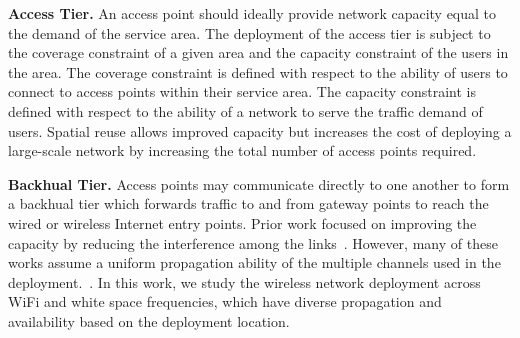 \textbf{Access Tier.} 
An access point should ideally provide network capacity equal to the demand of the service 
area. The deployment of the access tier is subject to the coverage constraint of a given area and the capacity 
constraint of the users in the area. The coverage constraint is defined with respect to the ability of 
users to connect to access points within their service area. The capacity constraint is defined with 
respect to the ability of a network to serve the traffic demand of users. Spatial reuse allows improved 
capacity but increases the cost of deploying a large-scale network by increasing the total number of access points 
required. 

\textbf{Backhual Tier.} 
Access points may communicate directly to one another to form a backhual tier which forwards traffic to and from 
gateway points to reach the wired or wireless Internet entry points. 
Prior work focused on improving the capacity 
by reducing the interference among the links~\cite{si2010overview,doraghinejad2014channel}. 
However, many of these works assume a uniform propagation ability of the multiple channels used in the deployment.~\cite{doraghinejad2014channel}. 
In this work, we study the wireless network deployment across WiFi and white space frequencies, which have diverse 
propagation and availability based on the deployment location.





 







